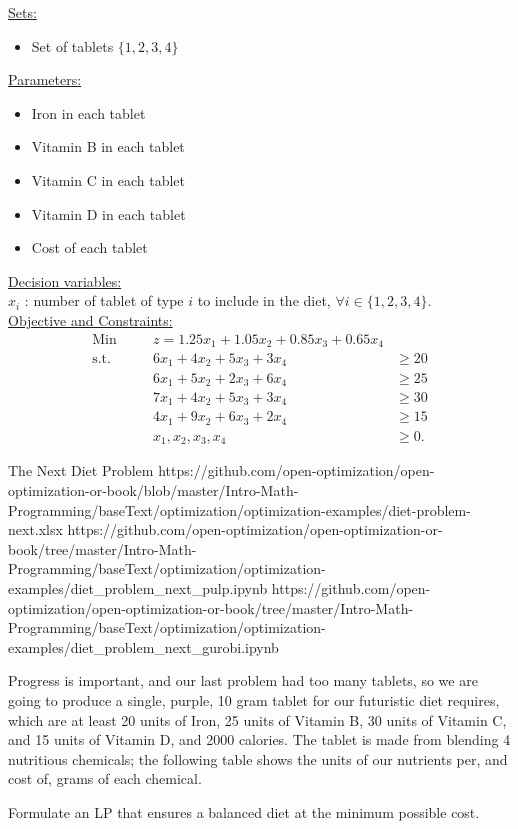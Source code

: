 \begin{solution}
\smallskip \underline{Sets:}
\begin{itemize}
\item Set of tablets $\{1,2,3,4\}$
\end{itemize}

\smallskip \underline{Parameters:}
\begin{itemize}
\item Iron in each tablet
\item Vitamin B in each tablet
\item Vitamin C in each tablet
\item Vitamin D in each tablet
\item Cost of each tablet
\end{itemize}

\smallskip  \underline{Decision variables:} \\
$x_i$ : number of tablet of type $i$ to include in the diet, $\forall i \in \{1,2,3,4\}$.\\

\smallskip  \underline{Objective and Constraints:}
\begin{align*}
\mbox{Min~~ } && z = 1.25x_1 + 1.05x_2 + 0.85x_3 + 0.65x_4 \\
\mbox{s.t.~~} &&  6x_1 + 4x_2 + 5x_3 + 3x_4 &\ge 20  \\
&& 6x_1 + 5x_2 + 2x_3 + 6x_4 &\ge 25 \\
&& 7x_1 + 4x_2 + 5x_3 + 3x_4 &\ge 30 \\
&& 4x_1 + 9x_2 + 6x_3 + 2x_4 &\ge 15  \\
&& x_1, x_2, x_3, x_4 &\ge 0. 
\end{align*}
\end{solution}





\begin{examplewithallcode}{The Next Diet Problem}
{https://github.com/open-optimization/open-optimization-or-book/blob/master/Intro-Math-Programming/baseText/optimization/optimization-examples/diet-problem-next.xlsx}
{https://github.com/open-optimization/open-optimization-or-book/tree/master/Intro-Math-Programming/baseText/optimization/optimization-examples/diet_problem_next_pulp.ipynb}
{https://github.com/open-optimization/open-optimization-or-book/tree/master/Intro-Math-Programming/baseText/optimization/optimization-examples/diet_problem_next_gurobi.ipynb}


Progress is important, and our last problem had too many tablets, so we are going to produce a single, purple, 10 gram tablet for our futuristic diet requires, which are at least 20 units of Iron, 25 units of Vitamin B, 30 units of Vitamin C, and 15 units of Vitamin D, and 2000 calories. The tablet is made from blending 4 nutritious chemicals; the following table shows the units of our nutrients per, and cost of, grams of each chemical.

Formulate an LP that ensures a balanced diet at the minimum possible cost.
\end{examplewithallcode}

